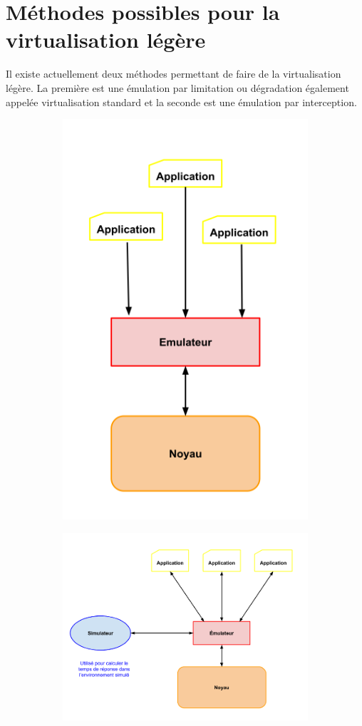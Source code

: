 \section{Méthodes possibles pour la virtualisation légère}
\label{section:emulation}

Il existe actuellement deux méthodes permettant de faire de la virtualisation
légère. La première est une émulation par limitation ou dégradation également
appelée virtualisation standard et la seconde est une émulation par
interception.

\begin{figure}[H]
  \centering 
  \begin{subfigure}{0.3\textwidth}
    \includegraphics[scale=0.35]{Pictures/png/Virtualisation_limitation}
  \end{subfigure}
  \begin{subfigure}{0.3\textwidth}
    \includegraphics[scale=0.3]{Pictures/png/Virtualisation_interception}

\end{subfigure}
\end{figure}
